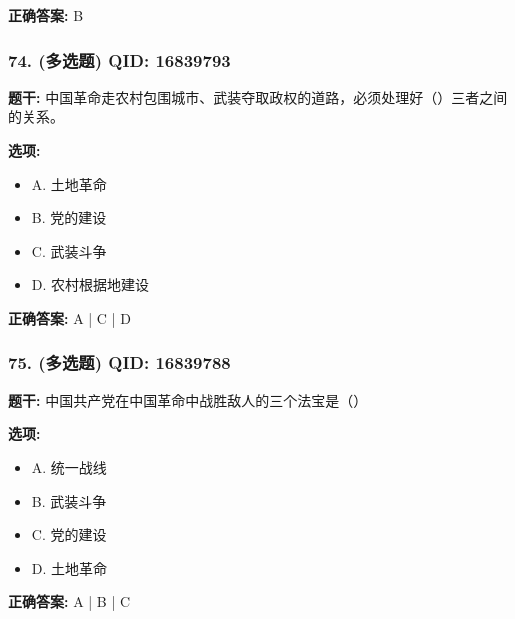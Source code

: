 \documentclass[12pt,UTF8]{ctexart}
\begin{document}
\textbf{正确答案:}
B

\vspace{0.3em}\hrulefill\vspace{0.7em}

\subsubsection*{74. (多选题) \small QID: 16839793}

\textbf{题干:}
中国革命走农村包围城市、武装夺取政权的道路，必须处理好（）三者之间的关系。

\textbf{选项:}
\begin{itemize}[leftmargin=*]

  \item A. 土地革命

  \item B. 党的建设

  \item C. 武装斗争

  \item D. 农村根据地建设

\end{itemize}

\textbf{正确答案:}
A | C | D

\vspace{0.3em}\hrulefill\vspace{0.7em}

\subsubsection*{75. (多选题) \small QID: 16839788}

\textbf{题干:}
中国共产党在中国革命中战胜敌人的三个法宝是（）

\textbf{选项:}
\begin{itemize}[leftmargin=*]

  \item A. 统一战线

  \item B. 武装斗争

  \item C. 党的建设

  \item D. 土地革命

\end{itemize}

\textbf{正确答案:}
A | B | C

\vspace{0.3em}\hrulefill\vspace{0.7em}
\end{document}
